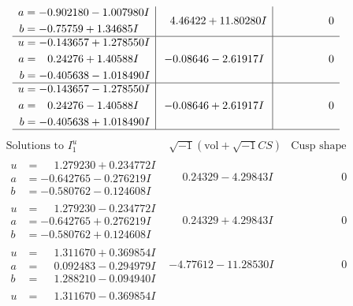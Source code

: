 \documentclass[1p]{elsarticle_modified}
\theoremstyle{definition}
\newcommand{\I}{\sqrt{-1}}
\begin{document}
$$\begin{array}{c|c|c}
\begin{aligned}
a &= -0.902180 - 1.007980 I \\
b &= -0.75759 + 1.34685 I\end{aligned}
 & \phantom{-}4.46422 + 11.80280 I & \phantom{-0.000000 } 0 \\ \hline\begin{aligned}
u &= -0.143657 + 1.278550 I \\
a &= \phantom{-}0.24276 + 1.40588 I \\
b &= -0.405638 - 1.018490 I\end{aligned}
 & -0.08646 - 2.61917 I & \phantom{-0.000000 } 0 \\ \hline\begin{aligned}
u &= -0.143657 - 1.278550 I \\
a &= \phantom{-}0.24276 - 1.40588 I \\
b &= -0.405638 + 1.018490 I\end{aligned}
 & -0.08646 + 2.61917 I & \phantom{-0.000000 } 0\\
 \hline 
 \end{array}$$\newpage$$\begin{array}{c|c|c}  
\text{Solutions to }I^u_{1}& \I (\text{vol} + \sqrt{-1}CS) & \text{Cusp shape}\\
 \hline 
\begin{aligned}
u &= \phantom{-}1.279230 + 0.234772 I \\
a &= -0.642765 - 0.276219 I \\
b &= -0.580762 - 0.124608 I\end{aligned}
 & \phantom{-}0.24329 - 4.29843 I & \phantom{-0.000000 } 0 \\ \hline\begin{aligned}
u &= \phantom{-}1.279230 - 0.234772 I \\
a &= -0.642765 + 0.276219 I \\
b &= -0.580762 + 0.124608 I\end{aligned}
 & \phantom{-}0.24329 + 4.29843 I & \phantom{-0.000000 } 0 \\ \hline\begin{aligned}
u &= \phantom{-}1.311670 + 0.369854 I \\
a &= \phantom{-}0.092483 - 0.294979 I \\
b &= \phantom{-}1.288210 - 0.094940 I\end{aligned}
 & -4.77612 - 11.28530 I & \phantom{-0.000000 } 0 \\ \hline\begin{aligned}
u &= \phantom{-}1.311670 - 0.369854 I \\

\end{aligned}
\end{array}$$
\end{document}
